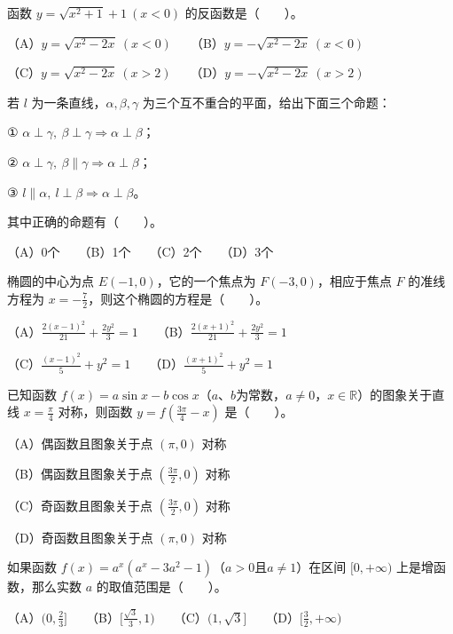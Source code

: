\begin{question}
函数 $y=\sqrt{x^2+1}+1\ (x<0)$ 的反函数是\mbox{（　　）}。

（A）$y=\sqrt{x^2-2x}\ (x<0)$　　（B）$y=-\sqrt{x^2-2x}\ (x<0)$

（C）$y=\sqrt{x^2-2x}\ (x>2)$　　（D）$y=-\sqrt{x^2-2x}\ (x>2)$

\end{question}
\begin{question}
若 $l$ 为一条直线，$\alpha,\beta,\gamma$ 为三个互不重合的平面，给出下面三个命题：

① $\alpha\perp\gamma,\ \beta\perp\gamma\Rightarrow\alpha\perp\beta$；

② $\alpha\perp\gamma,\ \beta\parallel\gamma\Rightarrow\alpha\perp\beta$；

③ $l\parallel\alpha,\ l\perp\beta\Rightarrow\alpha\perp\beta$。

其中正确的命题有\mbox{（　　）}。

（A）0个　　（B）1个　　（C）2个　　（D）3个

\end{question}
\begin{question}
椭圆的中心为点 $E(-1,0)$，它的一个焦点为 $F(-3,0)$，相应于焦点 $F$ 的准线方程为 $x=-\frac72$，则这个椭圆的方程是\mbox{（　　）}。

（A）$\frac{2(x-1)^2}{21}+\frac{2y^2}{3}=1$　　（B）$\frac{2(x+1)^2}{21}+\frac{2y^2}{3}=1$

（C）$\frac{(x-1)^2}{5}+y^2=1$　　（D）$\frac{(x+1)^2}{5}+y^2=1$

\end{question}
\begin{question}
已知函数 $f(x)=a\sin x-b\cos x$（$a\text{、}b$为常数，$a\ne0\text{，}x\in\mathbb R$）的图象关于直线 $x=\frac\pi4$ 对称，则函数 $y=f(\frac{3\pi}4-x)$ 是\mbox{（　　）}。

（A）偶函数且图象关于点 $(\pi,0)$ 对称

（B）偶函数且图象关于点 $(\frac{3\pi}2,0)$ 对称

（C）奇函数且图象关于点 $(\frac{3\pi}2,0)$ 对称

（D）奇函数且图象关于点 $(\pi,0)$ 对称

\end{question}
\begin{question}
如果函数 $f(x)=a^x(a^x-3a^2-1)$（$a>0$且$a\ne1$）在区间 $[0,+\infty)$ 上是增函数，那么实数 $a$ 的取值范围是\mbox{（　　）}。

（A）$(0,\frac23]$　　（B）$[\frac{\sqrt3}3,1)$　　（C）$(1,\sqrt3]$　　（D）$[\frac32,+\infty)$

\end{question}

